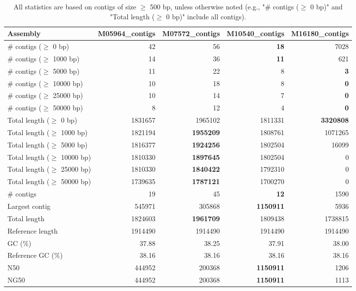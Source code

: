 \documentclass[12pt,a4paper]{article}
\begin{document}
\begin{table}[ht]
\begin{center}
\caption{All statistics are based on contigs of size $\geq$ 500 bp, unless otherwise noted (e.g., "\# contigs ($\geq$ 0 bp)" and "Total length ($\geq$ 0 bp)" include all contigs).}
\begin{tabular}{|l*{4}{|r}|}
\hline
Assembly & M05964\_contigs & M07572\_contigs & M10540\_contigs & M16180\_contigs \\ \hline
\# contigs ($\geq$ 0 bp) & 42 & 56 & {\bf 18} & 7028 \\ \hline
\# contigs ($\geq$ 1000 bp) & 14 & 36 & {\bf 11} & 621 \\ \hline
\# contigs ($\geq$ 5000 bp) & 11 & 22 & 8 & {\bf 3} \\ \hline
\# contigs ($\geq$ 10000 bp) & 10 & 18 & 8 & {\bf 0} \\ \hline
\# contigs ($\geq$ 25000 bp) & 10 & 14 & 7 & {\bf 0} \\ \hline
\# contigs ($\geq$ 50000 bp) & 8 & 12 & 4 & {\bf 0} \\ \hline
Total length ($\geq$ 0 bp) & 1831657 & 1965102 & 1811331 & {\bf 3320808} \\ \hline
Total length ($\geq$ 1000 bp) & 1821194 & {\bf 1955209} & 1808761 & 1071265 \\ \hline
Total length ($\geq$ 5000 bp) & 1816377 & {\bf 1924256} & 1802504 & 16099 \\ \hline
Total length ($\geq$ 10000 bp) & 1810330 & {\bf 1897645} & 1802504 & 0 \\ \hline
Total length ($\geq$ 25000 bp) & 1810330 & {\bf 1840422} & 1792310 & 0 \\ \hline
Total length ($\geq$ 50000 bp) & 1739635 & {\bf 1787121} & 1700270 & 0 \\ \hline
\# contigs & 19 & 45 & {\bf 12} & 1590 \\ \hline
Largest contig & 545971 & 305868 & {\bf 1150911} & 5936 \\ \hline
Total length & 1824603 & {\bf 1961709} & 1809438 & 1738815 \\ \hline
Reference length & 1914490 & 1914490 & 1914490 & 1914490 \\ \hline
GC (\%) & 37.88 & 38.25 & 37.91 & 38.00 \\ \hline
Reference GC (\%) & 38.16 & 38.16 & 38.16 & 38.16 \\ \hline
N50 & 444952 & 200368 & {\bf 1150911} & 1206 \\ \hline
NG50 & 444952 & 200368 & {\bf 1150911} & 1113 \\ \hline

\end{tabular}
\end{center}
\end{table}
\end{document}
